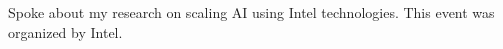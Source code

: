 \documentclass[]{deedy-resume-openfont}
\begin{document}
Spoke about my research on scaling AI using Intel technologies. This event was organized by Intel. \\
\sectionsep
\vspace{1mm}
\clearpage
\end{document}
